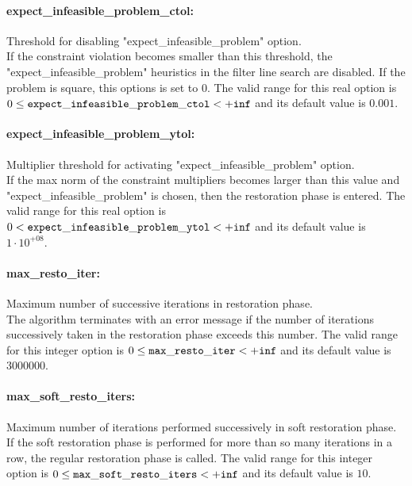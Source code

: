 \paragraph{expect\_infeasible\_problem\_ctol:}\label{opt:expect_infeasible_problem_ctol} Threshold for disabling "expect\_infeasible\_problem" option. \\
 If the constraint violation becomes smaller than this threshold, the "expect\_infeasible\_problem" heuristics in the filter line search are disabled. If the problem is square, this options is set to 0. The valid range for this real option is 
$0 \le {\tt expect\_infeasible\_problem\_ctol } <  {\tt +inf}$
and its default value is $0.001$.


\paragraph{expect\_infeasible\_problem\_ytol:}\label{opt:expect_infeasible_problem_ytol} Multiplier threshold for activating "expect\_infeasible\_problem" option. \\
 If the max norm of the constraint multipliers becomes larger than this value and "expect\_infeasible\_problem" is chosen, then the restoration phase is entered. The valid range for this real option is 
$0 <  {\tt expect\_infeasible\_problem\_ytol } <  {\tt +inf}$
and its default value is $1 \cdot 10^{+08}$.


\paragraph{max\_resto\_iter:}\label{opt:max_resto_iter} Maximum number of successive iterations in restoration phase. \\
 The algorithm terminates with an error message if the number of iterations successively taken in the restoration phase exceeds this number. The valid range for this integer option is
$0 \le {\tt max\_resto\_iter } <  {\tt +inf}$
and its default value is $3000000$.


\paragraph{max\_soft\_resto\_iters:}\label{opt:max_soft_resto_iters} Maximum number of iterations performed successively in soft restoration phase. \\
 If the soft restoration phase is performed for more than so many iterations in a row, the regular restoration phase is called. The valid range for this integer option is
$0 \le {\tt max\_soft\_resto\_iters } <  {\tt +inf}$
and its default value is $10$.


